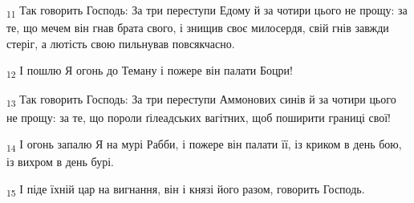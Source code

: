 \begin{tcolorbox}
\textsubscript{11} Так говорить Господь: За три переступи Едому й за чотири цього не прощу: за те, що мечем він гнав брата свого, і знищив своє милосердя, свій гнів завжди стеріг, а лютість свою пильнував повсякчасно.
\end{tcolorbox}
\begin{tcolorbox}
\textsubscript{12} І пошлю Я огонь до Теману і пожере він палати Боцри!
\end{tcolorbox}
\begin{tcolorbox}
\textsubscript{13} Так говорить Господь: За три переступи Аммонових синів й за чотири цього не прощу: за те, що пороли ґілеадських вагітних, щоб поширити границі свої!
\end{tcolorbox}
\begin{tcolorbox}
\textsubscript{14} І огонь запалю Я на мурі Рабби, і пожере він палати її, із криком в день бою, із вихром в день бурі.
\end{tcolorbox}
\begin{tcolorbox}
\textsubscript{15} І піде їхній цар на вигнання, він і князі його разом, говорить Господь.
\end{tcolorbox}
